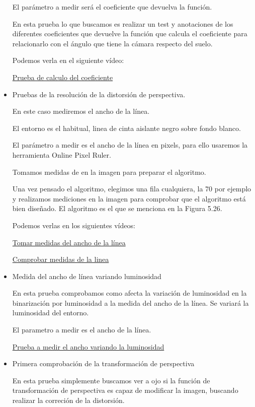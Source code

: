 \begin{itemize}
El parámetro a medir será el coeficiente que devuelva la función.

En esta prueba lo que buscamos es realizar un test y anotaciones de los diferentes coeficientes que devuelve la función que calcula el coeficiente para relacionarlo con el ángulo que tiene la cámara respecto del suelo.
	
	Podemos verla en el siguiente vídeo: 
	
	\href{https://youtu.be/Y9QgFIMXSiU}{Prueba de calculo del coeficiente}
	
	
	\item Pruebas de la resolución de la distorsión de perspectiva. 
	
	En este caso mediremos el ancho de la línea.
	
El entorno es el habitual, linea de cinta aislante negro sobre fondo blanco.

El parámetro a medir es el ancho de la línea en pixels, para ello
usaremos la herramienta Online Pixel Ruler.

Tomamos medidas de en la imagen para preparar el algoritmo.

Una vez pensado el algoritmo, elegimos una fila cualquiera, la 70 por ejemplo y realizamos mediciones en la imagen para comprobar que el algoritmo está bien diseñado. El algoritmo es el que se menciona en la Figura 5.26.

	
	Podemos verlas en los siguientes vídeos:
	
	\href{https://youtu.be/rUQrHbA_H8A}{Tomar medidas del ancho de la línea}
	
	\href{https://youtu.be/ClA-Ei8f18o}{Comprobar medidas de la linea}
	
	\item Medida del ancho de línea variando luminosidad
	
	En esta prueba comprobamos como afecta la variación de luminosidad en la binarización por luminosidad a la medida del ancho de la línea.
Se variará la luminosidad del entorno.

El parametro a medir es el ancho de la línea.
	
	\href{https://youtu.be/m7t4dcfuFeo}{Prueba a medir el ancho variando la luminosidad}
	
	\item Primera comprobación de la transformación de perspectiva
	
	En esta prueba simplemente buscamos ver a ojo si la función de transformación de perspectiva es capaz de modificar la imagen, buscando realizar la correción de la distorsión.
	

\end{itemize}
